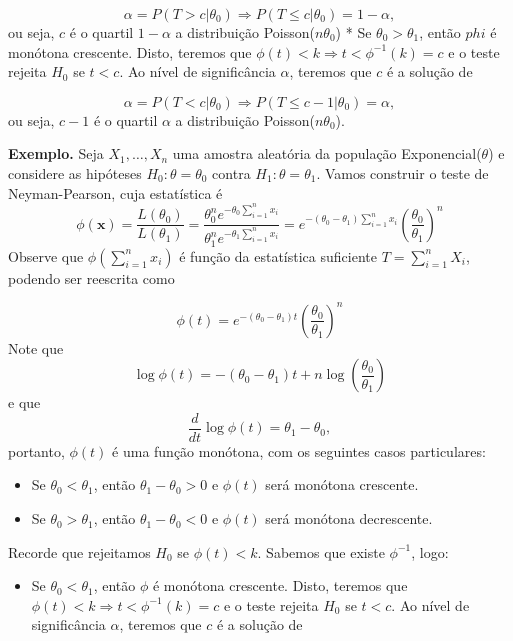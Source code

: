 \documentclass[
  letterpaper,
  DIV=11,
  numbers=noendperiod]{scrartcl}
\providecommand{\tightlist}{%
  \setlength{\itemsep}{0pt}\setlength{\parskip}{0pt}}\usepackage{longtable,booktabs,array}
\begin{document}
\[\alpha=P(T>c|\theta_0)\Rightarrow P(T\leq c|\theta_0)=1-\alpha,\] ou
seja, \(c\) é o quartil \(1-\alpha\) a distribuição
Poisson(\(n\theta_0\)) * Se \(\theta_0>\theta_1\), então \(phi\) é
monótona crescente. Disto, teremos que
\(\phi(t)<k\Rightarrow t <\phi^{-1}(k)=c\) e o teste rejeita \(H_0\) se
\(t<c\). Ao nível de significância \(\alpha\), teremos que \(c\) é a
solução de

\[\alpha=P(T<c|\theta_0)\Rightarrow P(T\leq c-1|\theta_0)=\alpha,\] ou
seja, \(c-1\) é o quartil \(\alpha\) a distribuição
Poisson(\(n\theta_0\)).

\textbf{Exemplo.} Seja \(X_1,\ldots,X_n\) uma amostra aleatória da
população Exponencial(\(\theta\)) e considere as hipóteses
\(H_0:\theta=\theta_0\) contra \(H_1:\theta=\theta_1\). Vamos construir
o teste de Neyman-Pearson, cuja estatística é
\[\phi(\textbf{x})=\frac{L(\theta_0)}{L(\theta_1)}=\frac{\theta_0^ne^{-\theta_0\sum_{i=1}^n x_i}}{\theta_1^n e^{-\theta_1\sum_{i=1}^n x_i}}=e^{-(\theta_0-\theta_1)\sum_{i=1}^n x_i}\left(\frac{\theta_0}{\theta_1}\right)^n\]
Observe que \(\phi(\sum_{i=1}^n x_i)\) é função da estatística
suficiente \(T=\sum_{i=1}^n X_i\), podendo ser reescrita como

\[\phi(t)=e^{-(\theta_0-\theta_1)t} \left(\frac{\theta_0}{\theta_1}\right)^n\]
Note que
\[\log \phi(t)=-(\theta_0-\theta_1)t + n\log\left(\frac{\theta_0}{\theta_1}\right)\]
e que \[\frac{d}{dt}\log \phi(t)=\theta_1-\theta_0,\] portanto,
\(\phi(t)\) é uma função monótona, com os seguintes casos particulares:

\begin{itemize}
\item
  Se \(\theta_0<\theta_1\), então \(\theta_1-\theta_0>0\) e \(\phi(t)\)
  será monótona crescente.
\item
  Se \(\theta_0>\theta_1\), então \(\theta_1-\theta_0<0\) e \(\phi(t)\)
  será monótona decrescente.
\end{itemize}

Recorde que rejeitamos \(H_0\) se \(\phi(t)<k\). Sabemos que existe
\(\phi^{-1}\), logo:

\begin{itemize}
\tightlist
\item
  Se \(\theta_0<\theta_1\), então \(\phi\) é monótona crescente. Disto,
  teremos que \(\phi(t)<k\Rightarrow t <\phi^{-1}(k)=c\) e o teste
  rejeita \(H_0\) se \(t<c\). Ao nível de significância \(\alpha\),
  teremos que \(c\) é a solução de
\end{itemize}
\end{document}
